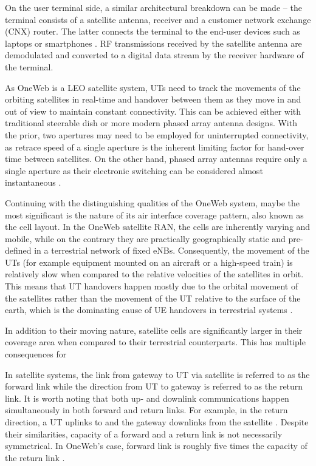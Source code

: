 \documentclass[english, 12pt, a4paper, elec, utf8, a-1b, online]{aaltothesis}
\begin{document}
On the user terminal side, a similar architectural breakdown can be made – the terminal consists of a satellite antenna, receiver and a customer network exchange (CNX) router.
The latter connects the terminal to the end-user devices such as laptops or smartphones \cite{henri2020oneweb}. RF transmissions received by the satellite antenna are demodulated and converted to a digital data stream by the receiver hardware of the terminal.

As OneWeb is a LEO satellite system, UTs need to track the movements of the orbiting satellites in real-time and handover between them as they move in and out of view to maintain constant connectivity.
This can be achieved either with traditional steerable dish or more modern phased array antenna designs.
With the prior, two apertures may need to be employed for uninterrupted connectivity, as retrace speed of a single aperture is the inherent limiting factor for hand-over time between satellites.
On the other hand, phased array antennas require only a single aperture as their electronic switching can be considered almost instantaneous \cite{worldvu2016loi}.

Continuing with the distinguishing qualities of the OneWeb system, maybe the most significant is the nature of its air interface coverage pattern, also known as the cell layout.
In the OneWeb satellite RAN, the cells are inherently varying and mobile, while on the contrary they are practically geographically static and pre-defined in a terrestrial network of fixed eNBs.
Consequently, the movement of the UTs (for example equipment mounted on an aircraft or a high-speed train) is relatively slow when compared to the relative velocities of the satellites in orbit.
This means that UT handovers happen mostly due to the orbital movement of the satellites rather than the movement of the UT relative to the surface of the earth, which is the dominating cause of UE handovers in terrestrial systems \cite{corson2019admission}.

In addition to their moving nature, satellite cells are significantly larger in their coverage area when compared to their terrestrial counterparts.
This has multiple consequences for \cite{corson2019admission}

In satellite systems, the link from gateway to UT via satellite is referred to as the forward link while the direction from UT to gateway is referred to as the return link.
It is worth noting that both up- and downlink communications happen simultaneously in both forward and return links.
For example, in the return direction, a UT uplinks to and the gateway downlinks from the satellite \cite{kymeta2019link}.
Despite their similarities, capacity of a forward and a return link is not necessarily symmetrical.
In OneWeb's case, forward link is roughly five times the capacity of the return link \cite{worldvu2016loi, portillo2019technical}.
\end{document}
